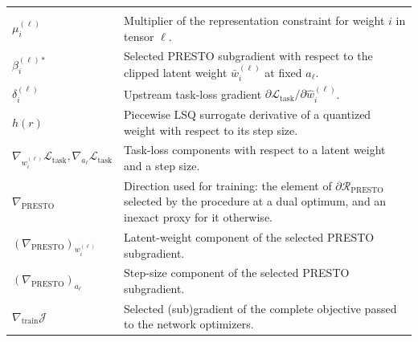 \documentclass{article}
\begin{document}
\begin{longtable}{>{\raggedright\arraybackslash}p{}
                  >{\raggedright\arraybackslash}p{}}
  \addlinespace
  \multicolumn{2}{l}{\textit{Sensitivity and training gradients}}\\*
  $\mu_i^{(\ell)}$ & Multiplier of the representation constraint for weight $i$ in tensor $\ell$. \\
  $\beta_i^{(\ell)*}$ & Selected PRESTO subgradient with respect to the clipped latent weight $\bar w_i^{(\ell)}$ at fixed $a_\ell$. \\
  $\delta_i^{(\ell)}$ & Upstream task-loss gradient $\partial\mathcal L_{\mathrm{task}}/\partial\widehat w_i^{(\ell)}$. \\
  $h(r)$ & Piecewise LSQ surrogate derivative of a quantized weight with respect to its step size. \\
  $\nabla_{w_i^{(\ell)}}\mathcal L_{\mathrm{task}},\nabla_{a_\ell}\mathcal L_{\mathrm{task}}$ & Task-loss components with respect to a latent weight and a step size. \\
  $\nabla_{\mathrm{PRESTO}}$ & Direction used for training: the element of $\partial\mathcal R_{\mathrm{PRESTO}}$ selected by the procedure at a dual optimum, and an inexact proxy for it otherwise. \\
  $\left(\nabla_{\mathrm{PRESTO}}\right)_{w_i^{(\ell)}}$ & Latent-weight component of the selected PRESTO subgradient. \\
  $\left(\nabla_{\mathrm{PRESTO}}\right)_{a_\ell}$ & Step-size component of the selected PRESTO subgradient. \\
  $\nabla_{\mathrm{train}}\mathcal J$ & Selected (sub)gradient of the complete objective passed to the network optimizers. \\


\end{longtable}
\end{document}
